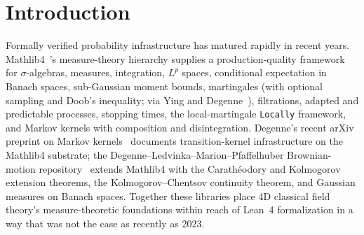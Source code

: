 \documentclass[11pt]{article}
\begin{document}
\begin{abstract}
Varadhan compatibility predicates; the inf-projection inequality plus
zero-at-zero for the contraction principle; and the Phase~6n
Wave~2c.5c+ \texttt{IsLDPRateFunction} instance for the W-form
Gallavotti--Cohen field), and is discharged for the program's
centered linear-response Gaussian rate function via the substantive
lemma \texttt{linearResponseRateFunctionCentered\_continuous}
(continuity of the centered quadratic shape) and the pre-existing
\texttt{linearResponseRateFunctionCentered\_zero}; concrete-witness
instances on the program's existing linear-response rate function;
and the upstream-coordination scoping document. All headline theorems
verify under the standard Lean~4 kernel plus
\texttt{[propext, Classical.choice, Quot.sound]} via
\texttt{lean\_verify}; zero \texttt{sorry}; zero new axioms. The
library is released under Apache~2.0 alongside the rest of the
SK--EFT Hawking codebase. The upstream-PR cycle to Mathlib4 is
\emph{not yet} initiated (it is staged for the post-Phase~6o
window per the program's explicit AI-tool-assistance disclosure
protocol), but each module is authored with Mathlib's naming and
style conventions to ease that future PR cycle.
\end{abstract}


\section{Introduction}
\label{sec:intro}

Formally verified probability infrastructure has matured rapidly in
recent years. Mathlib4~\cite{mathlib4_2020}'s measure-theory hierarchy
supplies a production-quality framework for $\sigma$-algebras, measures,
integration, $L^p$ spaces, conditional expectation in Banach spaces,
sub-Gaussian moment bounds, martingales (with optional sampling and
Doob's inequality; via Ying and
Degenne~\cite{YingDegenne2022Martingales}), filtrations, adapted and
predictable processes, stopping times, the local-martingale
\texttt{Locally} framework, and Markov kernels with composition and
disintegration. Degenne's recent
arXiv preprint on Markov kernels~\cite{Degenne2025MarkovKernels}
documents transition-kernel infrastructure on the Mathlib4 substrate;
the Degenne--Ledvinka--Marion--Pfaffelhuber Brownian-motion
repository~\cite{Degenne2025BrownianMotion} extends Mathlib4 with
the Carath\'eodory and Kolmogorov extension theorems, the
Kolmogorov--Chentsov continuity theorem, and Gaussian measures on
Banach spaces. Together these libraries place 4D classical
field theory's measure-theoretic foundations within reach of Lean~4
formalization in a way that was not the case as recently as 2023.
\end{document}
